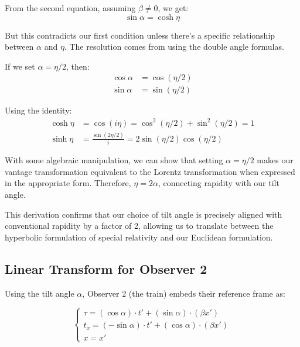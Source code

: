 \documentclass{article}
\begin{document}
From the second equation, assuming $\beta \neq 0$, we get:
\begin{equation}
\sin\alpha = \cosh\eta
\end{equation}

But this contradicts our first condition unless there's a specific relationship between $\alpha$ and $\eta$. The resolution comes from using the double angle formulas.

If we set $\alpha = \eta/2$, then:
\begin{equation}
\begin{aligned}
\cos\alpha &= \cos(\eta/2) \\
\sin\alpha &= \sin(\eta/2)
\end{aligned}
\end{equation}

Using the identity:
\begin{equation}
\begin{aligned}
\cosh\eta &= \cos(i\eta) = \cos^2(\eta/2) + \sin^2(\eta/2) = 1 \\
\sinh\eta &= \frac{\sin(2\eta/2)}{i} = 2\sin(\eta/2)\cos(\eta/2)
\end{aligned}
\end{equation}

With some algebraic manipulation, we can show that setting $\alpha = \eta/2$ makes our vantage transformation equivalent to the Lorentz transformation when expressed in the appropriate form. Therefore, $\eta = 2\alpha$, connecting rapidity with our tilt angle.

This derivation confirms that our choice of tilt angle is precisely aligned with conventional rapidity by a factor of 2, allowing us to translate between the hyperbolic formulation of special relativity and our Euclidean formulation.

\subsection{Linear Transform for Observer 2}

Using the tilt angle $\alpha$, Observer 2 (the train) embeds their reference frame as:

\begin{equation}
\begin{cases}
\tau = (\cos\alpha) \cdot t' + (\sin\alpha) \cdot (\beta x') \\
t_x = (-\sin\alpha) \cdot t' + (\cos\alpha) \cdot (\beta x') \\
x = x'
\end{cases}
\end{equation}
\end{document}
